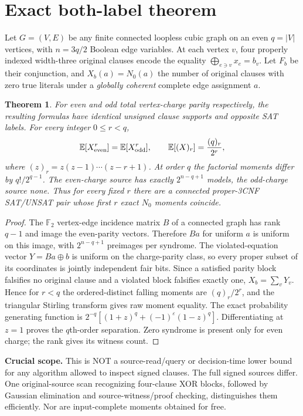 \documentclass[11pt]{article}
\newtheorem{theorem}{Theorem}
\begin{document}
\section{Exact both-label theorem}
Let $G=(V,E)$ be any finite connected loopless cubic graph on an even $q=|V|$ vertices, with $n=3q/2$ Boolean edge variables. At each vertex $v$, four properly indexed width-three original clauses encode the equality $\bigoplus_{e\ni v}x_e=b_v$. Let $F_b$ be their conjunction, and $X_b(a)=N_0(a)$ the number of original clauses with zero true literals under a \emph{globally coherent} complete edge assignment $a$.
\begin{theorem}
For even and odd total vertex-charge parity respectively, the resulting formulas have identical unsigned clause supports and opposite SAT labels. For every integer $0\le r<q$,
\[
\mathbb E[X_{\rm even}^r]=\mathbb E[X_{\rm odd}^r],\qquad
\mathbb E[(X)_r]=\frac{(q)_r}{2^r},
\]
where $(z)_r=z(z-1)\cdots(z-r+1)$. At order $q$ the factorial moments differ by $q!/2^{q-1}$. The even-charge source has exactly $2^{n-q+1}$ models, the odd-charge source none. Thus for every fixed $r$ there are a connected proper-3CNF SAT/UNSAT pair whose first $r$ exact $N_0$ moments coincide.
\end{theorem}
\begin{proof}
The $\mathbb F_2$ vertex-edge incidence matrix $B$ of a connected graph has rank $q-1$ and image the even-parity vectors. Therefore $Ba$ for uniform $a$ is uniform on this image, with $2^{n-q+1}$ preimages per syndrome. The violated-equation vector $Y=Ba\oplus b$ is uniform on the charge-parity class, so every proper subset of its coordinates is jointly independent fair bits. Since a satisfied parity block falsifies no original clause and a violated block falsifies exactly one, $X_b=\sum_vY_v$. Hence for $r<q$ the ordered-distinct falling moments are $(q)_r/2^r$, and the triangular Stirling transform gives raw moment equality. The exact probability generating function is $2^{-q}[(1+z)^q+(-1)^\varepsilon(1-z)^q]$. Differentiating at $z=1$ proves the $q$th-order separation. Zero syndrome is present only for even charge; the rank gives its witness count.
\end{proof}
\noindent\textbf{Crucial scope.} This is NOT a source-read/query or decision-time lower bound for any algorithm allowed to inspect signed clauses. The full signed sources differ. One original-source scan recognizing four-clause XOR blocks, followed by Gaussian elimination and source-witness/proof checking, distinguishes them efficiently. Nor are input-complete moments obtained for free.
\end{document}
